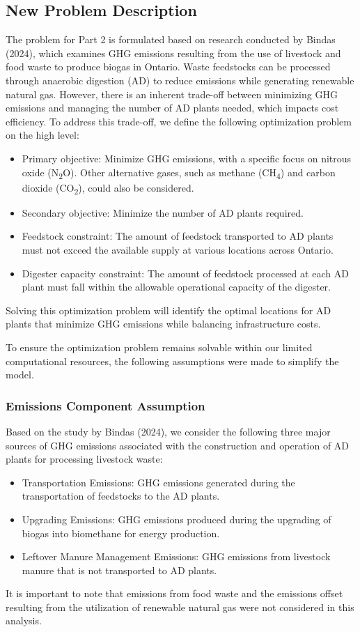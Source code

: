 \documentclass[12pt]{article}
\begin{document}
\subsection{New Problem Description}
The problem for Part 2 is formulated based on research conducted by Bindas (2024), which examines GHG emissions resulting from the use of livestock and food waste to produce biogas in Ontario. Waste feedstocks can be processed through anaerobic digestion (AD) to reduce emissions while generating renewable natural gas. However, there is an inherent trade-off between minimizing GHG emissions and managing the number of AD plants needed, which impacts cost efficiency. To address this trade-off, we define the following optimization problem on the high level:
\begin{itemize}
  \item Primary objective: Minimize GHG emissions, with a specific focus on nitrous oxide (N\textsubscript{2}O). Other alternative gases, such as methane (CH\textsubscript{4}) and carbon dioxide (CO\textsubscript{2}), could also be considered.
  \item Secondary objective: Minimize the number of AD plants required.
  \item Feedstock constraint: The amount of feedstock transported to AD plants must not exceed the available supply at various locations across Ontario.
  \item Digester capacity constraint: The amount of feedstock processed at each AD plant must fall within the allowable operational capacity of the digester.
\end{itemize}
Solving this optimization problem will identify the optimal locations for AD plants that minimize GHG emissions while balancing infrastructure costs.

\noindent To ensure the optimization problem remains solvable within our limited computational resources, the following assumptions were made to simplify the model.

\subsubsection*{Emissions Component Assumption}
Based on the study by Bindas (2024), we consider the following three major sources of GHG emissions associated with the construction and operation of AD plants for processing livestock waste:
\begin{itemize}
  \item Transportation Emissions: GHG emissions generated during the transportation of feedstocks to the AD plants.
  \item Upgrading Emissions: GHG emissions produced during the upgrading of biogas into biomethane for energy production.
  \item Leftover Manure Management Emissions: GHG emissions from livestock manure that is not transported to AD plants.
\end{itemize}
It is important to note that emissions from food waste and the emissions offset resulting from the utilization of renewable natural gas were not considered in this analysis.
\end{document}
